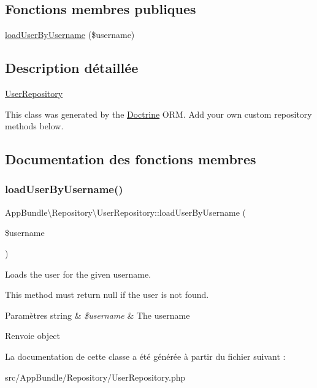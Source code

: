 \subsection*{Fonctions membres publiques}
\begin{DoxyCompactItemize}
\item 
\hyperlink{classAppBundle_1_1Repository_1_1UserRepository_a9f5eba7601e80cdf9c2d9d9471d67561}{load\+User\+By\+Username} (\$username)
\end{DoxyCompactItemize}


\subsection{Description détaillée}
\hyperlink{classAppBundle_1_1Repository_1_1UserRepository}{User\+Repository}

This class was generated by the \hyperlink{namespaceAppBundle_1_1Doctrine}{Doctrine} O\+RM. Add your own custom repository methods below. 

\subsection{Documentation des fonctions membres}
\mbox{\label{classAppBundle_1_1Repository_1_1UserRepository_a9f5eba7601e80cdf9c2d9d9471d67561}} 
\subsubsection{\texorpdfstring{load\+User\+By\+Username()}{loadUserByUsername()}}
{\footnotesize\ttfamily App\+Bundle\textbackslash{}\+Repository\textbackslash{}\+User\+Repository\+::load\+User\+By\+Username (\begin{DoxyParamCaption}\item[{}]{\$username }\end{DoxyParamCaption})}

Loads the user for the given username.

This method must return null if the user is not found.


\begin{DoxyParams}[1]{Paramètres}
string & {\em \$username} & The username\\
\hline
\end{DoxyParams}
\begin{DoxyReturn}{Renvoie}
object 
\end{DoxyReturn}


La documentation de cette classe a été générée à partir du fichier suivant \+:\begin{DoxyCompactItemize}
\item 
src/\+App\+Bundle/\+Repository/User\+Repository.\+php\end{DoxyCompactItemize}
